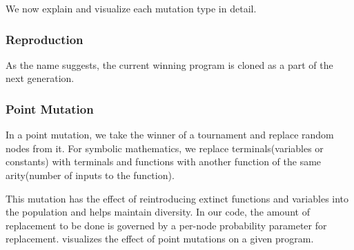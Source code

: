 We now explain and visualize each mutation type in detail.

\subsubsection{Reproduction}
\label{mut:clone}
As the name suggests, the current winning program is cloned as a part of the next generation.
\subsubsection{Point Mutation}
\label{mut:point}
In a point mutation, we take the winner of a tournament and replace random nodes from it. For symbolic mathematics, we replace terminals(variables or constants) with terminals and functions with another function of the same arity(number of inputs to the function).

This mutation has the effect of reintroducing extinct functions and variables into the population and helps maintain diversity\citep{gplearn}. In our code, the amount of replacement to be done is governed by a per-node probability parameter for replacement.  visualizes the effect of point mutations on a given program.

